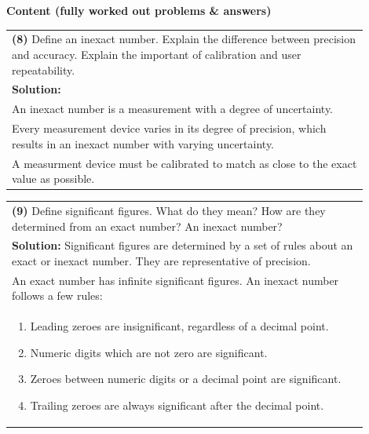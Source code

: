 \documentclass{article}
\begin{document}
\newpage
\noindent
{\large \textbf{Content (fully worked out problems \& answers)}} \\[0.2em]

\begin{tabular}{|p{0.9\linewidth}|}
\hline
\textbf{(8)} Define an inexact number. Explain the difference between precision and accuracy. Explain the important of calibration and user repeatability. \\
\textbf{Solution:} \\
An inexact number is a measurement with a degree of uncertainty. \\
Every measurement device varies in its degree of precision, which results in an inexact number with varying uncertainty. \\
A measurment device must be calibrated to match as close to the exact value as possible. \\
\hline
\end{tabular}




\begin{tabular}{|p{0.9\linewidth}|}
\hline
\textbf{(9)} Define significant figures. What do they mean? How are they determined from an exact number? An inexact number? \\
\textbf{Solution:} Significant figures are determined by a set of rules about an exact or inexact number. They are representative of precision. \\
An exact number has infinite significant figures.
An inexact number follows a few rules: \\
\begin{enumerate}
    \item Leading zeroes are insignificant, regardless of a decimal point.
    \item Numeric digits which are not zero are significant.
    \item Zeroes between numeric digits or a decimal point are significant.
    \item Trailing zeroes are always significant after the decimal point.
\end{enumerate} \\
\hline
\end{tabular}
\end{document}
